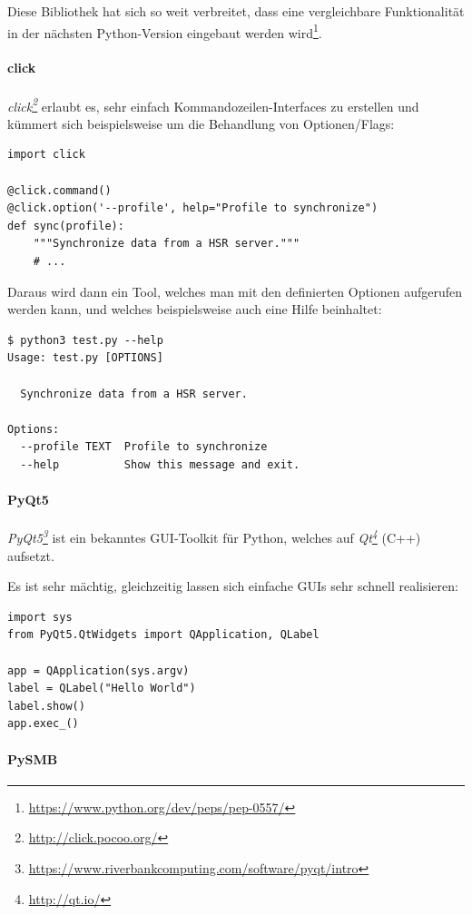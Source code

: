 \documentclass[a4paper]{article}
\newcommand{\tool}[2]{\emph{#1\footnote{\url{#2}}}}
\begin{document}
Diese Bibliothek hat sich so weit verbreitet, dass eine vergleichbare
Funktionalität in der nächsten Python-Version eingebaut werden wird\footnote{\url{https://www.python.org/dev/peps/pep-0557/}}.

\paragraph{click}

\tool{click}{http://click.pocoo.org/} erlaubt es, sehr einfach
Kommandozeilen-Interfaces zu erstellen und kümmert sich beispielsweise um die
Behandlung von Optionen/Flags:

\begin{verbatim}
import click

@click.command()
@click.option('--profile', help="Profile to synchronize")
def sync(profile):
    """Synchronize data from a HSR server."""
    # ...
\end{verbatim}

Daraus wird dann ein Tool, welches man mit den definierten Optionen aufgerufen
werden kann, und welches beispielsweise auch eine Hilfe beinhaltet:

\begin{verbatim}
$ python3 test.py --help
Usage: test.py [OPTIONS]

  Synchronize data from a HSR server.

Options:
  --profile TEXT  Profile to synchronize
  --help          Show this message and exit.
\end{verbatim}

\paragraph{PyQt5}

\tool{PyQt5}{https://www.riverbankcomputing.com/software/pyqt/intro} ist ein
bekanntes GUI-Toolkit für Python, welches auf \tool{Qt}{http://qt.io/} (C++) aufsetzt.

Es ist sehr mächtig, gleichzeitig lassen sich einfache GUIs sehr schnell
realisieren:

\begin{verbatim}
import sys
from PyQt5.QtWidgets import QApplication, QLabel

app = QApplication(sys.argv)
label = QLabel("Hello World")
label.show()
app.exec_()
\end{verbatim}

\paragraph{PySMB}
\end{document}

